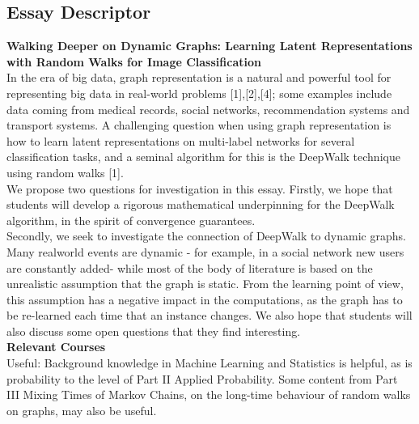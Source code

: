 \documentclass[a4paper]{article}
\begin{document}
\subsection*{Essay Descriptor}
\textbf{Walking Deeper on Dynamic Graphs: Learning Latent Representations
with Random Walks for Image Classification}\\
In the era of big data, graph representation is a natural and powerful tool for representing big
data in real-world problems [1],[2],[4]; some examples include data coming from medical records,
social networks, recommendation systems and transport systems. A challenging question when
using graph representation is how to learn latent representations on multi-label networks for
several classification tasks, and a seminal algorithm for this is the DeepWalk technique using
random walks [1].\\
We propose two questions for investigation in this essay. Firstly, we hope that students will
develop a rigorous mathematical underpinning for the DeepWalk algorithm, in the spirit of
convergence guarantees.\\
Secondly, we seek to investigate the connection of DeepWalk to dynamic graphs. Many realworld events are dynamic - for example, in a social network new users are constantly added- while
most of the body of literature is based on the unrealistic assumption that the graph is static.
From the learning point of view, this assumption has a negative impact in the computations, as the graph has to be re-learned each time that an instance changes. We also hope that students
will also discuss some open questions that they find interesting.\\
\textbf{Relevant Courses}\\
Useful: Background knowledge in Machine Learning and Statistics is helpful, as is probability
to the level of Part II Applied Probability. Some content from Part III Mixing Times of Markov
Chains, on the long-time behaviour of random walks on graphs, may also be useful.\\






\printindex
\end{document}
